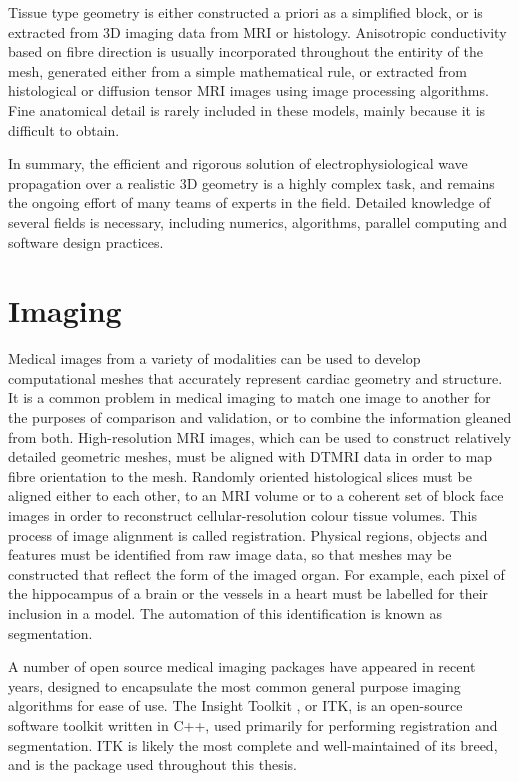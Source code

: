   Tissue type geometry is either constructed a priori as a simplified block, or is extracted from 3D imaging data from MRI or histology. Anisotropic conductivity based on fibre direction is usually incorporated throughout the entirity of the mesh, generated either from a simple mathematical rule, or extracted from histological or diffusion tensor MRI images using image processing algorithms. Fine anatomical detail is rarely included in these models, mainly because it is difficult to obtain.
    
  In summary, the efficient and rigorous solution of electrophysiological wave propagation over a realistic 3D geometry is a highly complex task, and remains the ongoing effort of many teams of experts in the field. Detailed knowledge of several fields is necessary, including numerics, algorithms, parallel computing and software design practices.

\section{Imaging}
\label{imaging}
  Medical images from a variety of modalities can be used to develop computational meshes that accurately represent cardiac geometry and structure. It is a common problem in medical imaging to match one image to another for the purposes of comparison and validation, or to combine the information gleaned from both. High-resolution MRI images, which can be used to construct relatively detailed geometric meshes, must be aligned with DTMRI data in order to map fibre orientation to the mesh. Randomly oriented histological slices must be aligned either to each other, to an MRI volume or to a coherent set of block face images in order to reconstruct cellular-resolution colour tissue volumes. This process of image alignment is called registration. Physical regions, objects and features must be identified from raw image data, so that meshes may be constructed that reflect the form of the imaged organ. For example, each pixel of the hippocampus of a brain or the vessels in a heart must be labelled for their inclusion in a model. The automation of this identification is known as segmentation.
  
  A number of open source medical imaging packages have appeared in recent years, designed to encapsulate the most common general purpose imaging algorithms for ease of use. The Insight Toolkit \cite{Yoo2002}, or ITK, is an open-source software toolkit written in C++, used primarily for performing registration and segmentation. ITK is likely the most complete and well-maintained of its breed, and is the package used throughout this thesis.
  
